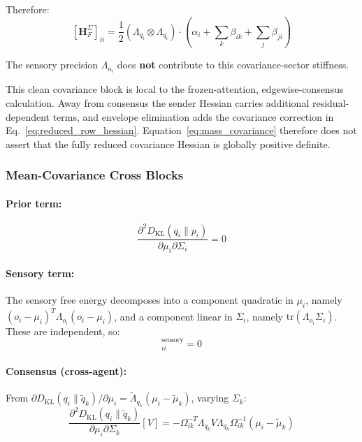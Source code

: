 \documentclass[12pt]{article}
\begin{document}
Therefore:
\begin{equation}
\boxed{
[\mathbf{H}_F^\Sigma]_{ii} = \frac{1}{2}(\Lambda_{q_i} \otimes \Lambda_{q_i}) \cdot \left(\alpha_i + \sum_k \beta_{ik} + \sum_j \beta_{ji}\right)
}
\label{eq:mass_covariance}
\end{equation}

The sensory precision $\Lambda_{o_i}$ does \textbf{not} contribute to this covariance-sector stiffness.

This clean covariance block is local to the frozen-attention, edgewise-consensus calculation. Away from consensus the sender Hessian carries additional residual-dependent terms, and envelope elimination adds the covariance correction in Eq.~\eqref{eq:reduced_row_hessian}. Equation~\eqref{eq:mass_covariance} therefore does not assert that the fully reduced covariance Hessian is globally positive definite.

\subsubsection{Mean-Covariance Cross Blocks}

\paragraph{Prior term:}
\begin{equation}
\frac{\partial^2 D_{\mathrm{KL}}(q_i \| p_i)}{\partial \mu_i \partial \Sigma_i} = 0
\end{equation}

\paragraph{Sensory term:} The sensory free energy decomposes into a component quadratic in $\mu_i$, namely $(o_i - \mu_i)^T\Lambda_{o_i}(o_i - \mu_i)$, and a component linear in $\Sigma_i$, namely $\mathrm{tr}(\Lambda_{o_i}\Sigma_i)$. These are independent, so:
\begin{equation}
[\mathbf{H}_F^{\mu\Sigma}]_{ii}^{\text{sensory}} = 0
\end{equation}

\paragraph{Consensus (cross-agent):} From $\partial D_{\mathrm{KL}}(q_i \| \tilde{q}_k)/\partial \mu_i = \tilde{\Lambda}_{q_k}(\mu_i - \tilde{\mu}_k)$, varying $\Sigma_k$:
\begin{equation}
\frac{\partial^2 D_{\mathrm{KL}}(q_i \| \tilde{q}_k)}{\partial \mu_i \partial \Sigma_k}[V] = -\Omega_{ik}^{-T}\Lambda_{q_k}V\Lambda_{q_k}\Omega_{ik}^{-1}(\mu_i - \tilde{\mu}_k)
\end{equation}
\end{document}
